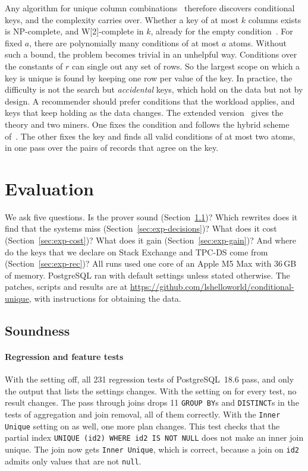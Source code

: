 \documentclass[conference]{IEEEtran}
\theoremstyle{definition}
\newcommand{\sql}[1]{\texttt{#1}}
\newcommand{\nul}{\texttt{null}}
\newif\ifextended
\begin{document}
Any algorithm for unique column combinations~\cite{PN17,BBFNPS20} therefore discovers conditional keys, and the
complexity carries over. Whether a key of at most $k$ columns exists is NP-complete, and W[2]-complete in $k$, already for
the empty condition~\cite{BFS22}. For fixed $a$, there are polynomially many conditions of at most $a$ atoms. Without such
a bound, the problem becomes trivial in an unhelpful way. Conditions over the constants of $r$ can single out any set of
rows. So the largest scope on which a key is unique is found by keeping one row per value of the key. In practice, the
difficulty is not the search but \emph{accidental} keys, which hold on the data but not by design. A recommender should
prefer conditions that the workload applies, and keys that keep holding as the data changes.
\ifextended Appendix~\ref{app:disc} \else The extended version~\cite{EXT} \fi gives the theory and two miners. One fixes
the condition and follows the hybrid scheme of~\cite{PN17}. The other fixes the key and finds all valid conditions of at
most two atoms, in one pass over the pairs of records that agree on the key.
\fi

\section{Evaluation}\label{sec:experiments}

We ask five questions. Is the prover sound (Section~\ref{sec:exp-sound})? Which rewrites does it find that the
systems miss (Section~\ref{sec:exp-decisions})? What does it cost (Section~\ref{sec:exp-cost})? What does it gain
(Section~\ref{sec:exp-gain})? And where do the keys that we declare on Stack Exchange and TPC-DS come from
(Section~\ref{sec:exp-rec})? All runs used one core of an Apple M5 Max with 36\,GB of memory. PostgreSQL ran with
default settings unless stated otherwise.\ifextended\else{} The patches, scripts and results are at
\url{https://github.com/lshelloworld/conditional-unique}, with instructions for obtaining the data.\fi

\subsection{Soundness}\label{sec:exp-sound}


\paragraph*{Regression and feature tests} With the setting off, all 231 regression tests of PostgreSQL~18.6 pass, and
only the output that lists the settings changes. With the setting on for every test, no result changes. The pass through joins drops
11 \sql{GROUP BY}s and \sql{DISTINCT}s in the tests of aggregation and join removal, all of them correctly. With the
\sql{Inner Unique} setting on as well, one more plan changes. This test checks that the partial index \sql{UNIQUE (id2)
WHERE id2 IS NOT NULL} does not make an inner join unique. The join now gets \sql{Inner Unique}, which is correct,
because a join on \sql{id2} admits only values that are not \nul.
\end{document}
